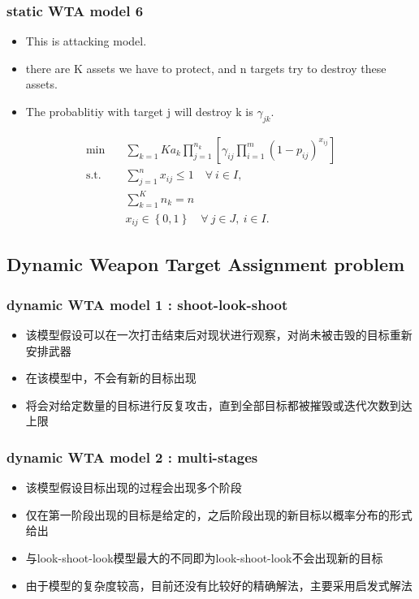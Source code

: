 \documentclass[CJK,10pt]{beamer}
\begin{document}
\begin{frame}
    \frametitle{static WTA model 6}
    \begin{itemize}
        \item This is attacking model.
        \item there are K assets we have to protect, and n targets try to destroy these assets. 
        \item The probablitiy with target j will destroy k is $\gamma_{jk}$. 
    \end{itemize}
    \begin{align*} \tag{S6}
        \min\quad & \sum_{k=1}{K}a_k\prod_{j=1}^{n_k}\left[ \gamma_{ij} \prod_{i=1}^m (1 -  p_{ij})^{x_{ij}}\right]\\
        \mathrm{s. t.}\quad &\sum_{j=1}^n x_{ij} \leq 1\quad \forall ~i \in I,\\
        & \sum_{k=1}^{K}n_k = n\\
        & x_{ij} \in \left\{ 0,1 \right\} \quad \forall~ j\in J , ~ i \in I.
    \end{align*}
\end{frame}

\subsection{Dynamic Weapon Target Assignment problem}
\begin{frame}
    \frametitle{dynamic WTA model 1 : shoot-look-shoot}
    \begin{itemize}
        \item 该模型假设可以在一次打击结束后对现状进行观察，对尚未被击毁的目标重新安排武器
        \item 在该模型中，不会有新的目标出现
        \item 将会对给定数量的目标进行反复攻击，直到全部目标都被摧毁或迭代次数到达上限
    \end{itemize}
\end{frame}

\begin{frame}
    \frametitle{dynamic WTA model 2 : multi-stages}
    \begin{itemize}
        \item 该模型假设目标出现的过程会出现多个阶段
        \item 仅在第一阶段出现的目标是给定的，之后阶段出现的新目标以概率分布的形式给出
        \item 与look-shoot-look模型最大的不同即为look-shoot-look不会出现新的目标
        \item 由于模型的复杂度较高，目前还没有比较好的精确解法，主要采用启发式解法
    \end{itemize}
\end{frame}
\end{document}
